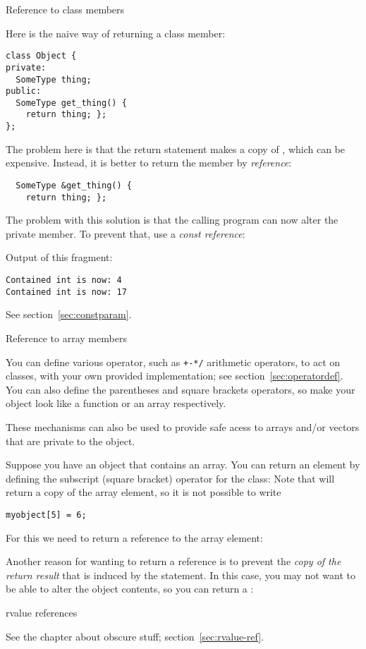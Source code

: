  {Reference to class members}
\label{sec:class-ref}

Here is the naive way of returning a class member:
\begin{verbatim}
class Object {
private:
  SomeType thing;
public:
  SomeType get_thing() {
    return thing; };
};
\end{verbatim}
The problem here is that the return statement makes a copy of
, which can be expensive. Instead, it is better to return the
member by \emph{reference}:
\begin{verbatim}
  SomeType &get_thing() { 
    return thing; };
\end{verbatim}
The problem with this solution is that the calling program can now
alter the private member. To prevent that, use a
\emph{const reference}:
%

Output of this fragment:
\begin{verbatim}
Contained int is now: 4
Contained int is now: 17
\end{verbatim}

See section~\ref{sec:constparam}.

 {Reference to array members}
\label{sec:overloadbracket}

You can define various operator, such as \verb.+-*/. arithmetic
operators, to act on classes, with your own provided implementation;
see section~\ref{sec:operatordef}. You can also define the parentheses
and square brackets operators, so make your object look like a
function or an array respectively.

These mechanisms can also be used to provide safe acess to arrays
and/or vectors that are private to the object.

Suppose you have an object that contains an  array. You can
return an element by defining the subscript (square bracket) operator
for the class:
%
%
Note that  will return a copy of the array element,
so it is not possible to write
\begin{verbatim}
myobject[5] = 6;
\end{verbatim}
For this we need to return a reference to the array element:
%

Another reason for wanting to return a reference is to prevent the
\emph{copy of the return result}
that is induced by the  statement.
In this case, you may not want to be able to alter the object
contents, so you can return a :
%

 {rvalue references}

See the chapter about obscure stuff; section~\ref{sec:rvalue-ref}.
